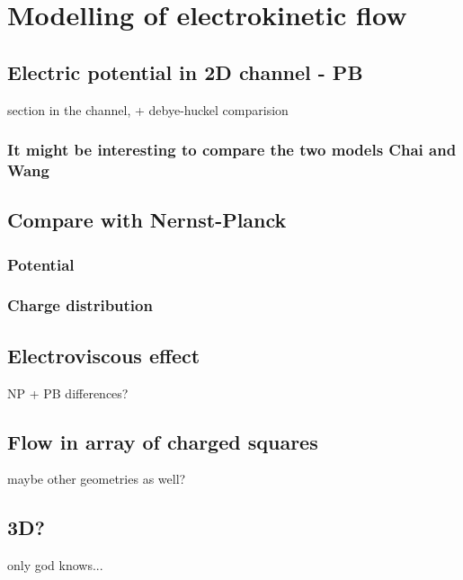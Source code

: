 \chapter{Modelling of electrokinetic flow}

\section{Electric potential in 2D channel - PB}
section in the channel, + debye-huckel comparision

\subsection{It might be interesting to compare the two models Chai and
Wang}

\section{Compare with Nernst-Planck}

\subsection{Potential}

\subsection{Charge distribution}

\section{Electroviscous effect}
NP + PB differences?

\section{Flow in array of charged squares}
maybe other geometries as well?

\section{3D?}
only god knows...
